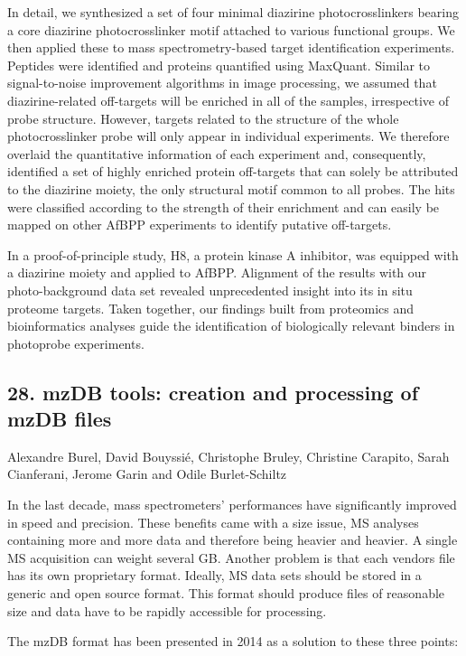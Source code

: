 In detail, we synthesized a set of four minimal diazirine photocrosslinkers bearing a core diazirine photocrosslinker motif attached to various functional groups. We then applied these to mass spectrometry-based target identification experiments. Peptides were identified and proteins quantified using MaxQuant. Similar to signal-to-noise improvement algorithms in image processing, we assumed that diazirine-related off-targets will be enriched in all of the samples, irrespective of probe structure. However, targets related to the structure of the whole photocrosslinker probe will only appear in individual experiments. We therefore overlaid the quantitative information of each experiment and, consequently, identified a set of highly enriched protein off-targets that can solely be attributed to the diazirine moiety, the only structural motif common to all probes. The hits were classified according to the strength of their enrichment and can easily be mapped on other AfBPP experiments to identify putative off-targets.


In a proof-of-principle study, H8, a protein kinase A inhibitor, was equipped with a diazirine moiety and applied to AfBPP. Alignment of the results with our photo-background data set revealed unprecedented insight into its in situ proteome targets. Taken together, our findings built from proteomics and bioinformatics analyses guide the identification of biologically relevant binders in photoprobe experiments.

\subsection*{\color{eubicRed} 28. mzDB tools: creation and processing of mzDB files}
{\color{eubicGray}Alexandre Burel, David Bouyssié, Christophe Bruley, Christine Carapito, Sarah Cianferani, Jerome Garin and Odile Burlet-Schiltz}

In the last decade, mass spectrometers’ performances have significantly improved in speed and precision. These benefits came with a size issue, MS analyses containing more and more data and therefore being heavier and heavier. A single MS acquisition can weight several GB. Another problem is that each vendors file has its own proprietary format. Ideally, MS data sets should be stored in a generic and open source format. This format should produce files of reasonable size and data have to be rapidly accessible for processing.

The mzDB format has been presented in 2014 as a solution to these three points:

